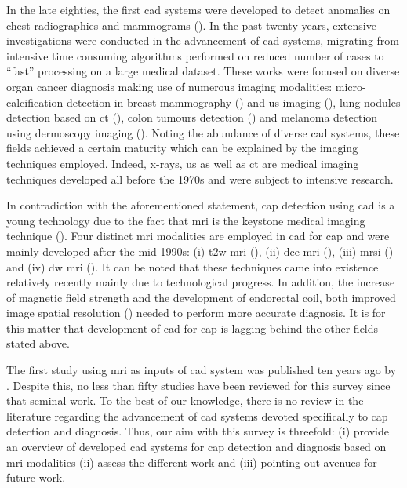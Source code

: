 In the late eighties, the first \acs{cad} systems were developed to detect anomalies on chest radiographies and mammograms (\cite{Doi1987,Chan1987,Giger1988}). In the past twenty years, extensive investigations were conducted in the advancement of \acs{cad} systems, migrating from intensive time consuming algorithms performed on reduced number of cases to ``fast'' processing on a large medical dataset. These works were focused on diverse organ cancer diagnosis making use of numerous imaging modalities: micro-calcification detection in breast mammography (\cite{Rangayyan2007,Elter2009}) and \ac{us} imaging (\cite{Cheng2010}), lung nodules detection based on \ac{ct} (\cite{Chan2008,Suzuki2012}), colon tumours detection (\cite{Suzuki2012}) and melanoma detection using dermoscopy imaging (\cite{Korotkov2012}). Noting the abundance of diverse \acs{cad} systems, these fields achieved a certain maturity which can be explained by the imaging techniques employed. Indeed, x-rays, \ac{us} as well as \ac{ct} are medical imaging techniques developed all before the 1970s and were subject to intensive research.

In contradiction with the aforementioned statement, \ac{cap} detection using \acs{cad} is a young technology due to the fact that \ac{mri} is the keystone medical imaging technique (\cite{Hegde2013}). Four distinct \ac{mri} modalities are employed in \acs{cad} for \ac{cap} and were mainly developed after the mid-1990s: (i) \ac{t2w} \ac{mri} (\cite{Hricak1983}), (ii) \ac{dce} \ac{mri} (\cite{HuchBoni1995}), (iii) \ac{mrsi} (\cite{Kurhanewicz1996}) and (iv) \ac{dw} \ac{mri} (\cite{Scheidler1999}). It can be noted that these techniques came into existence relatively recently mainly due to technological progress. In addition, the increase of magnetic field strength and the development of endorectal coil, both improved image spatial resolution (\cite{Swanson2001}) needed to perform more accurate diagnosis. It is for this matter that development of \acs{cad} for \ac{cap} is lagging behind the other fields stated above.

The first study using \ac{mri} as inputs of \acs{cad} system was published ten years ago by \cite{Chan2003}. Despite this, no less than fifty studies have been reviewed for this survey since that seminal work. To the best of our knowledge, there is no review in the literature regarding the advancement of \acs{cad} systems devoted specifically to \ac{cap} detection and diagnosis. Thus, our aim with this survey is threefold: (i) provide an overview of developed \acs{cad} systems for \ac{cap} detection and diagnosis based on \ac{mri} modalities (ii) assess the different work and (iii) pointing out avenues for future work.

